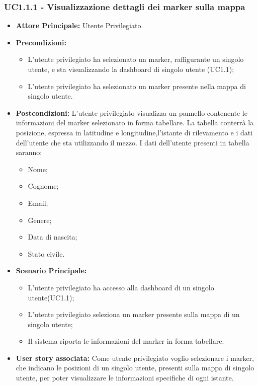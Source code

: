 \documentclass[11pt]{article}
\begin{document}
\begin{justify}
\subsubsection{\textbf{UC1.1.1 - Visualizzazione dettagli dei marker sulla mappa}}
\label{UC1.1.1}
\begin{itemize}
     \item \textbf{Attore Principale:} Utente Privilegiato.
     \item \textbf{Precondizioni:}
        \begin{itemize}
        \item L'utente privilegiato ha selezionato un marker, raffigurante un singolo utente, e sta visualizzando la dashboard di singolo utente (UC1.1);
          \item L'utente privilegiato ha selezionato un marker presente nella mappa di singolo utente.
        \end{itemize}
      \item \textbf{Postcondizioni:} L'utente privilegiato visualizza un pannello contenente le informazioni del marker selezionato in forma tabellare. La tabella conterrà la posizione, espressa in latitudine e longitudine,l'istante di rilevamento e i dati dell'utente che sta utilizzando il mezzo. I dati dell'utente presenti in tabella saranno:
        \begin{itemize}
        \item Nome;
        \item Cognome;
        \item Email;
        \item Genere;
        \item Data di nascita;
        \item Stato civile.
        \end{itemize}
      \item \textbf{Scenario Principale:}
        \begin{itemize}
            \item L'utente privilegiato ha accesso alla dashboard di un singolo utente(UC1.1);
            \item L'utente privilegiato seleziona un marker presente sulla mappa di un singolo utente;
            \item Il sistema riporta le informazioni del marker in forma tabellare.
        \end{itemize}
     \item \textbf{User story associata:}
       Come utente privilegiato voglio selezionare i marker, che indicano le posizioni di un singolo utente, presenti sulla mappa di singolo utente, per poter visualizzare le informazioni specifiche di ogni istante.

\end{itemize}
\end{justify}
\end{document}
